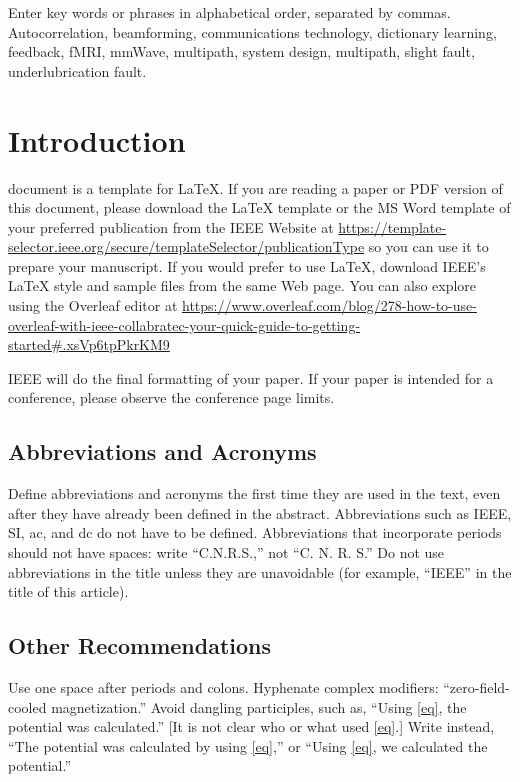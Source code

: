\documentclass{ieeeaccess}
\begin{document}
\begin{keywords}
    Enter key words or phrases in alphabetical
    order, separated by commas. Autocorrelation, beamforming, communications technology, dictionary learning, feedback, fMRI, mmWave, multipath, system design, multipath, slight fault, underlubrication fault.
\end{keywords}

\titlepgskip=-21pt

\maketitle

\section{Introduction}
\label{sec:introduction}
 document is a template for \LaTeX. If you are reading a paper or PDF version of this document, please download the LaTeX template or the MS Word
template of your preferred publication from the IEEE Website at \underline
{https://template-selector.ieee.org/secure/templateSelec}\break\underline{tor/publicationType} so you can use it to prepare your manuscript.
If you would prefer to use LaTeX, download IEEE's LaTeX style and sample files
from the same Web page. You can also explore using the Overleaf editor at
\underline
{https://www.overleaf.com/blog/278-how-to-use-overleaf-}\break\underline{with-ieee-collabratec-your-quick-guide-to-getting-started}\break\underline{\#.xsVp6tpPkrKM9}

IEEE will do the final formatting of your paper. If your paper is intended
for a conference, please observe the conference page limits.

\subsection{Abbreviations and Acronyms}
Define abbreviations and acronyms the first time they are used in the text,
even after they have already been defined in the abstract. Abbreviations
such as IEEE, SI, ac, and dc do not have to be defined. Abbreviations that
incorporate periods should not have spaces: write ``C.N.R.S.,'' not ``C. N.
R. S.'' Do not use abbreviations in the title unless they are unavoidable
(for example, ``IEEE'' in the title of this article).

\subsection{Other Recommendations}
Use one space after periods and colons. Hyphenate complex modifiers:
``zero-field-cooled magnetization.'' Avoid dangling participles, such as,
``Using \eqref{eq}, the potential was calculated.'' [It is not clear who or what
used \eqref{eq}.] Write instead, ``The potential was calculated by using \eqref{eq},'' or
``Using \eqref{eq}, we calculated the potential.''
\end{document}
